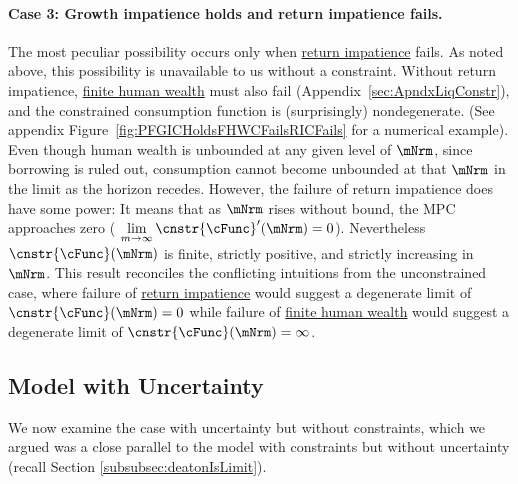 \documentclass[BufferStockTheory]{subfiles}
\begin{document}
\hypertarget{RICandFHWCFail}{}
\paragraph{Case 3: Growth impatience holds and return impatience fails.} The most peculiar possibility occurs only when \hyperlink{RIC}{return impatience} fails.
As noted above, this possibility is unavailable to us without a constraint.
Without return impatience, \hyperlink{FHWC}{finite human wealth} must also fail (Appendix~\ref{sec:ApndxLiqConstr}), and the constrained consumption function is (surprisingly) nondegenerate.
(See appendix Figure~\ref{fig:PFGICHoldsFHWCFailsRICFails} for a numerical example).
Even though human wealth is unbounded at any given level of $\mNrm$, since borrowing is ruled out, consumption cannot become unbounded at that $\mNrm$ in the limit as the horizon recedes.
However, the failure of return impatience does have some power: It means that as $\mNrm$ rises without bound, the MPC approaches zero ( $\lim\limits_{m \rightarrow \infty} \cnstr{\cFunc}^{\prime}(\mNrm) = 0$).
Nevertheless $\cnstr{\cFunc}(\mNrm)$ is finite, strictly positive, and strictly increasing in $\mNrm$.
This result reconciles the conflicting intuitions from the unconstrained case, where failure of \hyperlink{RIC}{return impatience} would suggest a degenerate limit of $\cnstr{\cFunc}(\mNrm)=0$ while failure of \hyperlink{FHWC}{finite human wealth} would suggest a degenerate limit of $\cnstr{\cFunc}(\mNrm)=\infty$.





\hypertarget{model-with-uncertainty}{}
\subsection{Model with Uncertainty}\label{subsec:TheModelUncertainty}

We now examine the case with uncertainty but without constraints, which we argued was a close parallel to the model with constraints but without uncertainty (recall Section \ref{subsubsec:deatonIsLimit}).
\hypertarget{Calibration}{}


\hypertarget{Symbols}{}


\end{document}
